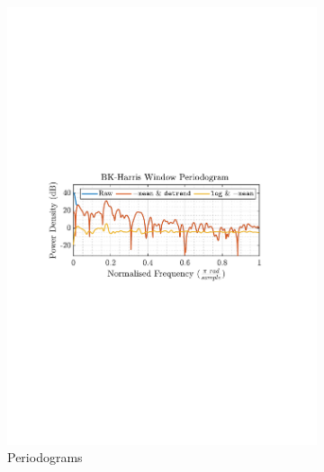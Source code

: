 \documentclass[12pt]{article}
\begin{document}
\begin{figure}[H]
\begin{subfigure}{0.49\textwidth}
			\includegraphics[trim={2.2cm 11.2cm 3.15cm  11.2cm}, clip, width=\textwidth]{../MATLAB/figures/q1_2a_fig02.pdf} 
			\captionsetup{justification=centering}
			\caption{Periodograms}
		\end{subfigure}
		\captionsetup{justification=centering}
		\caption{}
		\label{fig: 1-2a}
	\end{figure}
\end{document}
